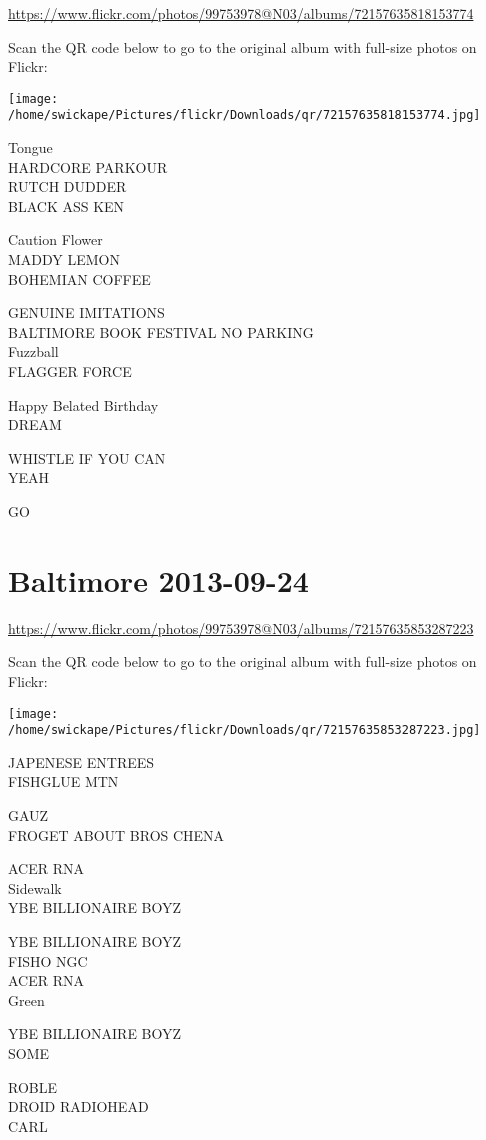 \documentclass[10pt,letterpaper]{article}
\begin{document}
\url{https://www.flickr.com/photos/99753978@N03/albums/72157635818153774}

Scan the QR code below to go to the original album with full-size photos on Flickr:

\texttt{[image: /home/swickape/Pictures/flickr/Downloads/qr/72157635818153774.jpg]}


Tongue\\
HARDCORE PARKOUR\\
RUTCH DUDDER\\
BLACK ASS KEN

Caution Flower\\
MADDY LEMON\\
BOHEMIAN COFFEE

GENUINE IMITATIONS\\
BALTIMORE BOOK FESTIVAL NO PARKING\\
Fuzzball\\
FLAGGER FORCE

Happy Belated Birthday\\
DREAM

WHISTLE IF YOU CAN\\
YEAH

GO


\section*{Baltimore 2013-09-24}

\url{https://www.flickr.com/photos/99753978@N03/albums/72157635853287223}

Scan the QR code below to go to the original album with full-size photos on Flickr:

\texttt{[image: /home/swickape/Pictures/flickr/Downloads/qr/72157635853287223.jpg]}


JAPENESE ENTREES\\
FISHGLUE MTN

GAUZ\\
FROGET ABOUT BROS CHENA

ACER RNA\\
Sidewalk\\
YBE BILLIONAIRE BOYZ

YBE BILLIONAIRE BOYZ\\
FISHO NGC\\
ACER RNA\\
Green

YBE BILLIONAIRE BOYZ\\
SOME

ROBLE\\
DROID RADIOHEAD\\
CARL
\end{document}
